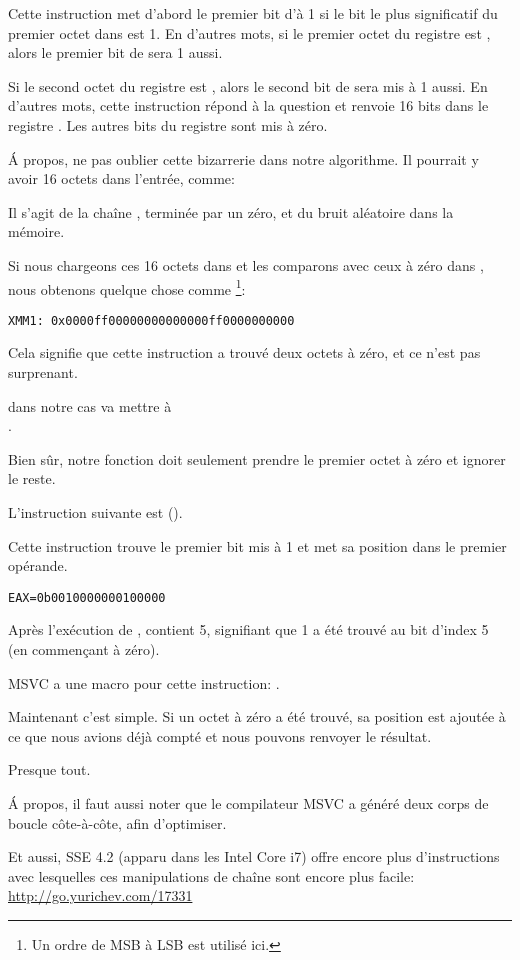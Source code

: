 Cette instruction met d'abord le premier bit d'\EAX à 1 si le bit le plus significatif
du premier octet dans  est 1.
En d'autres mots, si le premier octet du registre  est , alors le
premier bit de \EAX sera 1 aussi.

Si le second octet du registre  est , alors le second bit de \EAX
sera mis à 1 aussi.
En d'autres mots, cette instruction répond à la question  et renvoie
16 bits dans le registre \EAX.
Les autres bits du registre \EAX sont mis à zéro.

Á propos, ne pas oublier cette bizarrerie dans notre algorithme.
Il pourrait y avoir 16 octets dans l'entrée, comme:



Il s'agit de la chaîne , terminée par un zéro, et du bruit aléatoire
dans la mémoire.

Si nous chargeons ces 16 octets dans  et les comparons avec ceux à zéro dans
, nous obtenons quelque chose comme \footnote{Un ordre de \ac{MSB} à \ac{LSB}
est utilisé ici.}:

\begin{verbatim}
XMM1: 0x0000ff00000000000000ff0000000000
\end{verbatim}

Cela signifie que cette instruction a trouvé deux octets à zéro, et ce n'est pas
surprenant.

 dans notre cas va mettre \EAX à\\
.

Bien sûr, notre fonction doit seulement prendre le premier octet à zéro et ignorer
le reste.

\label{instruction_BSF}
L'instruction suivante est  ().

Cette instruction trouve le premier bit mis à 1 et met sa position dans le premier
opérande.

\begin{verbatim}
EAX=0b0010000000100000
\end{verbatim}

Après l'exécution de , \EAX contient 5, signifiant que 1 a été trouvé
au bit d'index 5 (en commençant à zéro).

MSVC a une macro pour cette instruction: .

Maintenant c'est simple. Si un octet à zéro a été trouvé, sa position est ajoutée
à ce que nous avions déjà compté et nous pouvons renvoyer le résultat.

Presque tout.

Á propos, il faut aussi noter que le compilateur MSVC a généré deux corps de boucle
côte-à-côte, afin d'optimiser.

Et aussi, SSE 4.2 (apparu dans les Intel Core i7) offre encore plus d'instructions
avec lesquelles ces manipulations de chaîne sont encore plus facile: \url{http://go.yurichev.com/17331}
